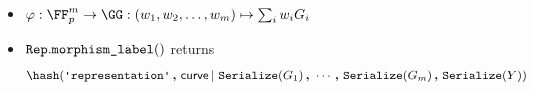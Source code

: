 \documentclass[11pt]{article}
\begin{document}
\begin{itemize}
  \item $\varphi:\FF_p^m\to\GG:(\witness_1,\witness_2, \dots, \witness_m)\mapsto \sum_i \witness_iG_i$
  \item $\texttt{Rep}.\texttt{morphism\_label}()$ returns
  \[
    \hash(\replabel \concat \curvectx \concatblock \serialize(G_1) \concat \cdots \concat \serialize(G_m) \concat \serialize(\statement))
  \]
\end{itemize}
\end{document}
